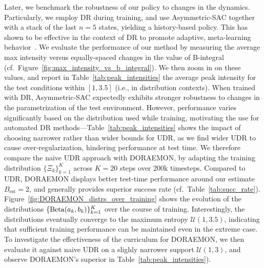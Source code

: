 Later, we benchmark the robustness of our policy to changes in the dynamics.
Particularly, we employ DR during training, and use Asymmetric-SAC together with a stack of the last $n=5$ states, yielding a history-based policy. This has shown to be effective in the context of DR to promote adaptive, meta-learning behavior~\citep{chen2021understanding, tiboni2023domain, akkaya2019solving}.
We evaluate the performance of our method by measuring the average max intensity versus equally-spaced changes in the value of B-integral (cf.~Figure~\ref{fig:max_intensity_vs_b_integral}). We then zoom in on these values, and report in Table~\ref{tab:peak_intensities} the average peak intensity for the test conditions within \( [1, 3.5] \) (i.e., in distribution contexts). When trained with DR, Asymmetric-SAC expectedly exhibits stronger robustness to changes in the parametrization of the test environment. However, performance varies significantly based on the distribution used while training, motivating the use for automated DR methods---Table~\ref{tab:peak_intensities} shows the impact of choosing narrower rather than wider bounds for UDR, as we find wider UDR to cause over-regularization, hindering performance at test time.
We therefore compare the naive UDR approach with DORAEMON, by adapting the training distribution \( \{ \Xi_{k} \}_{k=1}^K\) across $K=20$ steps over 200k timesteps. Compared to UDR, DORAEMON displays better test-time performance around our estimate $B_{\text{est}} = 2$, and generally provides superior success rate (cf.~Table~\ref{tab:succ_rate}).
Figure~\ref{fig:DORAEMON_distrs_over_training} shows the evolution of the distributions \(\{\text{Beta}(a_k, b_k) \}_{k=1}^{K} \) over the course of training.
Interestingly, the distributions eventually converge to the maximum entropy \( \mathcal U(1, 3.5) \), indicating that sufficient training performance can be maintained even in the extreme case. To investigate the effectiveness of the curriculum for DORAEMON, we then evaluate it against naive UDR on a slighly narrower support \( \mathcal U(1, 3) \), and observe DORAEMON's superior in Table~\ref{tab:peak_intensities}).

